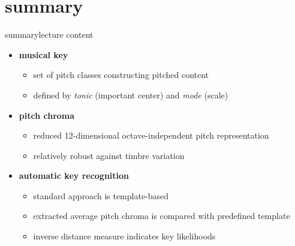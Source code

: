     \section{summary}
        \begin{frame}{summary}{lecture content}
            \begin{itemize}
                \item   \textbf{musical key}
                    \begin{itemize}
                        \item   set of pitch classes constructing pitched content
                        \item   defined by \textit{tonic} (important center) and \textit{mode} (scale)
                    \end{itemize}
                \bigskip
                \item   \textbf{pitch chroma}
                    \begin{itemize}
                        \item   reduced 12-dimensional octave-independent pitch representation
                        \item   relatively robust against timbre variation
                    \end{itemize}
                \bigskip
                \item   \textbf{automatic key recognition}
                    \begin{itemize}
                        \item   standard approach is template-based
                        \item   extracted average pitch chroma is compared with predefined template
                        \item   inverse distance measure indicates key likelihoods
                    \end{itemize}
            \end{itemize}
        \end{frame}

